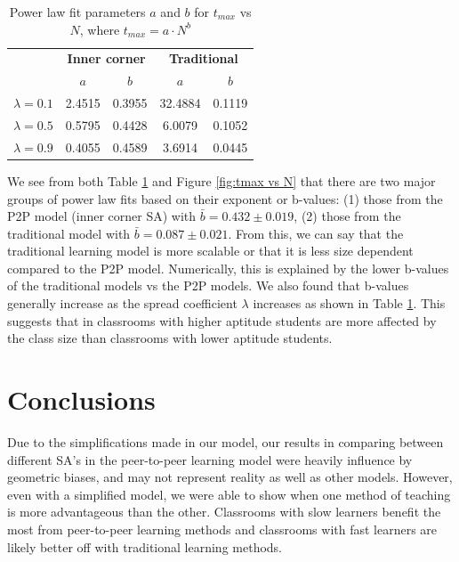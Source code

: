 \documentclass[10pt,a4paper,twoside]{article}
\begin{document}
\begin{table}[h]
  \centering
  
  \begin{tabular}{|c|cc|cc|}
    \hline
    & \multicolumn{2}{c|}{\textbf{Inner corner}}       & \multicolumn{2}{c|}{\textbf{Traditional}}        \\ \cline{2-5} 
    & \multicolumn{1}{c|}{\textbf{$a$}} & \textbf{$b$} & \multicolumn{1}{c|}{\textbf{$a$}} & \textbf{$b$} \\ \hline
    \textbf{$\lambda=0.1$} & \multicolumn{1}{c|}{2.4515}       & 0.3955       & \multicolumn{1}{c|}{32.4884}      & 0.1119       \\ \hline
    \textbf{$\lambda=0.5$} & \multicolumn{1}{c|}{0.5795}       & 0.4428       & \multicolumn{1}{c|}{6.0079}       & 0.1052       \\ \hline
    \textbf{$\lambda=0.9$} & \multicolumn{1}{c|}{0.4055}       & 0.4589       & \multicolumn{1}{c|}{3.6914}       & 0.0445       \\ \hline
  \end{tabular}
  \caption{Power law fit parameters $a$ and $b$ for $t_{max}$ vs $N$, where $t_{max}=a \cdot N ^ b$}
  \label{tab:tmax vs N fit params}
\end{table}

\noindent We see from both Table \ref{tab:tmax vs N fit params} and Figure \ref{fig:tmax vs N} that there are two major groups of power law fits based on their exponent or b-values: (1) those from the P2P model (inner corner SA) with $\bar{b} = 0.432 \pm 0.019$, (2) those from the traditional model with $\bar{b}=0.087\pm0.021$. From this, we can say that the traditional learning model is more scalable or that it is less size dependent compared to the P2P model. Numerically, this is explained by the lower b-values of the traditional models vs the P2P models. We also found that b-values generally increase as the spread coefficient $\lambda$ increases as shown in Table \ref{tab:tmax vs N fit params}. This suggests that in classrooms with higher aptitude students are more affected by the class size than classrooms with lower aptitude students.


\section{Conclusions}
Due to the simplifications made in our model, our results in comparing between different SA's in the peer-to-peer learning model were heavily influence by geometric biases, and may not represent reality as well as other models. However, even with a simplified model, we were able to show when one method of teaching is more advantageous than the other. Classrooms with slow learners benefit the most from peer-to-peer learning methods and classrooms with fast learners are likely better off with traditional learning methods.
\end{document}
